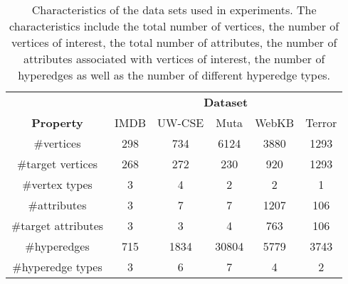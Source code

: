\begin{table}
\captionsetup{justification=justified}
\begin{center}
\caption{Characteristics of the data sets used in experiments. The characteristics include the total number of vertices, the number of vertices of interest, the total number of attributes, the number of attributes associated with vertices of interest, the number of hyperedges as well as the number of different hyperedge types.}
\label{tab:Data}
\begin{tabular}[t]{@{}cccccc@{}}


		\toprule
						  & \multicolumn{5}{c}{\textbf{Dataset}} \\
						  \cmidrule{2-6}
		\textbf{Property} & IMDB   & UW-CSE & Muta & WebKB & Terror \\
		\midrule
		\#vertices & 298  & 734 & 6124 & 3880  & 1293\\
		
		\#target vertices & 268 & 272  & 230 & 920  & 1293 \\
		
		\#vertex types & 3  & 4 & 2  & 2  & 1 \\
		
		\#attributes & 3   & 7 & 7 & 1207  & 106 \\
		
		\#target attributes & 3  & 3 & 4 & 763  & 106\\
		
		\#hyperedges & 715  & 1834 & 30804 & 5779  & 3743\\
		
		\#hyperedge types  & 3   & 6 & 7 & 4 & 2 \\
		\bottomrule
				

\end{tabular}
\end{center}

\end{table}


